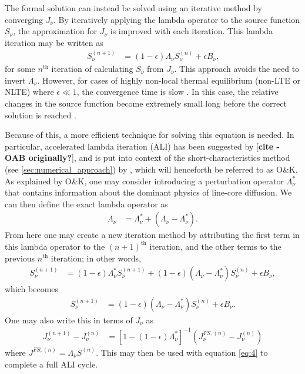 \documentclass[12pt]{article}
\begin{document}
The formal solution can instead be solved using an iterative method by converging $J_\nu$. By iteratively applying the lambda operator to the source function $S_\nu$, the approximation for $J_\nu$ is improved with each iteration. This lambda iteration may be written as
\begin{align}
S^{(n + 1)}_\nu
&=
(1 - \epsilon) \Lambda_\nu S^{(n)}_\nu + \epsilon B_\nu.
\end{align}
for some $n^\text{th}$ iteration of calculating $S_\nu$ from $J_\nu$. This approach avoids the need to invert $\Lambda_\nu$. However, for cases of highly non-local thermal equilibrium (non-LTE or NLTE) where $\epsilon \ll 1$, the convergence time is slow \citep[see, e.g.,][]{mihalas1978}. In this case, the relative changes in the source function become extremely small long before the correct solution is reached \citep[see][]{hubeny2003}.

Because of this, a more efficient technique for solving this equation is needed. In particular, accelerated lambda iteration (ALI) has been suggested by [\textbf{cite - OAB originally?}], and is put into context of the short-characteristics method (see \autoref{sec:numerical_approach}) by \cite{OandK1987}, which will henceforth be referred to as O\&K. As explained by O\&K, one may consider introducing a perturbation operator $\Lambda^*_\nu$ that contains information about the dominant physics of line-core diffusion. We can then define the exact lambda operator as
\begin{align}
\Lambda_\nu
&=
\Lambda^*_\nu + (\Lambda_\nu - \Lambda^*_\nu).
\end{align}
From here one may create a new iteration method by attributing the first term in this lambda operator to the $(n + 1)^\text{th}$ iteration, and the other terms to the previous $n^\text{th}$ iteration; in other words,
\begin{align}
S^{(n + 1)}_\nu
&=
(1 - \epsilon) \Lambda^*_\nu S^{(n + 1)}_\nu + (1 - \epsilon) (\Lambda_\nu - \Lambda^*_\nu) S^{(n)}_\nu + \epsilon B_\nu,
\end{align}
which becomes
\begin{align}
[1 - (1 - \epsilon) \Lambda^*_\nu] S^{(n + 1)}_\nu
&=
(1 - \epsilon) (\Lambda_\nu - \Lambda^*_\nu) S^{(n)}_\nu + \epsilon B_\nu.
\end{align}
One may also write this in terms of $J_\nu$ as
\begin{align}
J_\nu^{(n + 1)} - J_\nu^{(n)}
&=
[1 - (1 - \epsilon) \Lambda^*_\nu]^{-1} (J_\nu^{FS, (n)} - J_\nu^{(n)})
\label{eq:11}
\end{align}
where $J^{FS, (n)} = \Lambda_\nu S^{(n)}$. This may then be used with equation \ref{eq:4} to complete a full ALI cycle.
\end{document}
